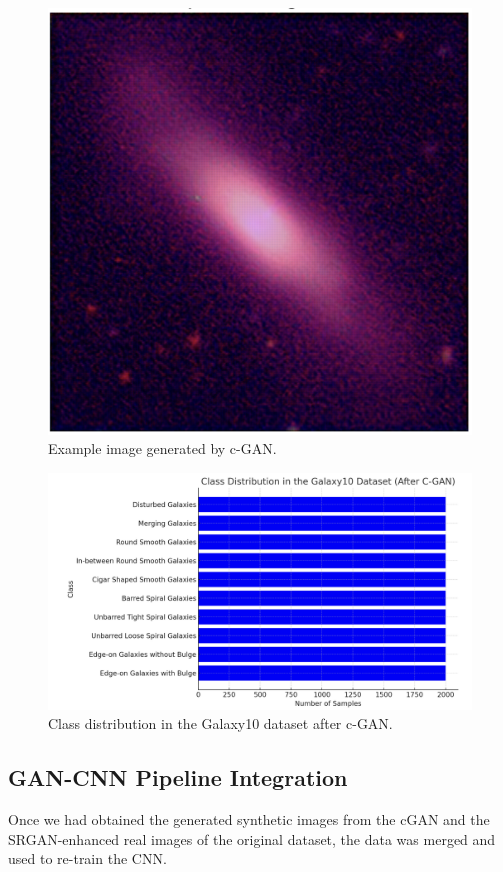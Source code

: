 \documentclass[10pt,twocolumn,letterpaper]{article}
\begin{document}
\begin{figure}[htbp]
  \includegraphics[width=\linewidth]{gernerated_image.png}
  \caption{Example image generated by c-GAN.}
  \label{fig:featuredist2}
\end{figure}
\begin{figure}[htbp]
  \includegraphics[width=\linewidth]{balanced classes.png}
  \caption{Class distribution in the Galaxy10 dataset after c-GAN.}
  \label{fig:featuredist2}
\end{figure}

\subsection{GAN-CNN Pipeline Integration} 
Once we had obtained the generated synthetic images from the cGAN and the SRGAN-enhanced real images of the original dataset, the data was merged and used to re-train the CNN.
\end{document}
